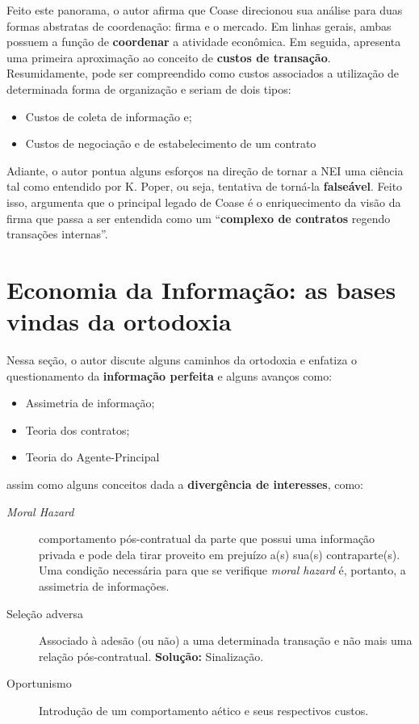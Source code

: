 \documentclass[9pt,twocolumn,twoside,lineno]{style}
\begin{document}
Feito este panorama, o autor afirma que Coase direcionou sua análise para duas formas abstratas de coordenação: firma e o mercado. Em linhas gerais, ambas possuem a função de \textbf{coordenar} a atividade econômica. Em seguida, apresenta uma primeira aproximação ao conceito de \textbf{custos de transação}. Resumidamente, pode ser compreendido como custos associados a utilização de determinada forma de organização e seriam de dois tipos:
\begin{itemize}
	\item Custos de coleta de informação e;
	\item Custos de negociação e de estabelecimento de um contrato
\end{itemize}
Adiante, o autor pontua alguns esforços na direção de tornar a NEI uma ciência tal como entendido por K. Poper, ou seja, tentativa de torná-la \textbf{falseável}.
Feito isso, argumenta que o principal legado de Coase é o enriquecimento da visão da firma que passa a ser entendida como um ``\textbf{complexo de contratos} regendo transações internas''.

\section{Economia da Informação: as bases vindas da ortodoxia}

Nessa seção, o autor discute alguns caminhos da ortodoxia e enfatiza o questionamento da \textbf{informação perfeita} e alguns avanços como:
\begin{itemize}
	\item Assimetria de informação;
	\item Teoria dos contratos;
	\item Teoria do Agente-Principal
\end{itemize}
assim como alguns conceitos dada a \textbf{divergência de interesses}, como:
	\begin{description}
		\item[\textit{Moral Hazard}] comportamento pós-contratual da parte que possui uma informação privada e pode dela tirar proveito em prejuízo a(s) sua(s) contraparte(s). Uma condição necessária para que se verifique \textit{moral hazard} é, portanto, a assimetria de informações.
		\item[Seleção adversa] Associado à adesão (ou não) a uma determinada transação e não mais uma relação pós-contratual. \textbf{Solução:} Sinalização.
		\item[Oportunismo] Introdução de um comportamento aético e seus respectivos custos.
	\end{description}
\end{document}
